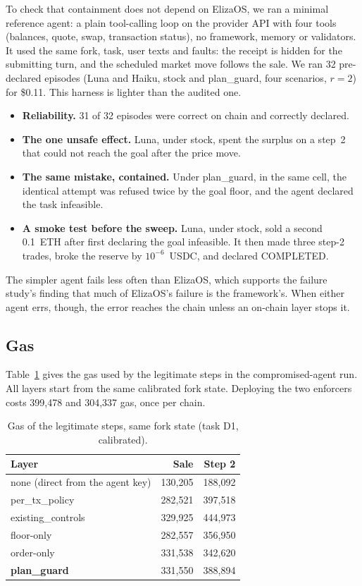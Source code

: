 \documentclass[conference]{IEEEtran}
\begin{document}
To check that containment does not depend on ElizaOS, we ran a minimal reference agent: a plain tool-calling loop on
the provider API with four tools (balances, quote, swap, transaction status), no framework, memory or validators.
It used the same fork, task, user texts and faults: the receipt is hidden for the submitting turn, and the scheduled
market move follows the sale. We ran 32 pre-declared episodes (Luna and Haiku, stock and plan\_guard, four scenarios,
$r=2$) for \$0.11. This harness is lighter than the audited one.
\begin{itemize}
\item \textbf{Reliability.} 31 of 32 episodes were correct on chain and correctly declared.
\item \textbf{The one unsafe effect.} Luna, under stock, spent the surplus on a step~2 that could not reach the goal
after the price move.
\item \textbf{The same mistake, contained.} Under plan\_guard, in the same cell, the identical attempt was refused twice
by the goal floor, and the agent declared the task infeasible.
\item \textbf{A smoke test before the sweep.} Luna, under stock, sold a second 0.1~ETH after first declaring the goal
infeasible. It then made three step-2 trades, broke the reserve by $10^{-6}$~USDC, and declared COMPLETED.
\end{itemize}
The simpler agent fails less often than ElizaOS, which supports the failure study's finding that much of ElizaOS's
failure is the framework's. When either agent errs, though, the error reaches the chain unless an on-chain layer stops
it.

\subsection{Gas}

Table~\ref{tab:gas} gives the gas used by the legitimate steps in the compromised-agent run. All layers start from
the same calibrated fork state. Deploying the two enforcers costs 399{,}478 and 304{,}337 gas, once per chain.

\begin{table}[t]
\centering
\caption{Gas of the legitimate steps, same fork state (task D1, calibrated).}
\label{tab:gas}
\begin{tabular}{lrr}
\toprule
Layer & Sale & Step 2 \\
\midrule
none (direct from the agent key) & 130{,}205 & 188{,}092 \\
per\_tx\_policy & 282{,}521 & 397{,}518 \\
existing\_controls & 329{,}925 & 444{,}973 \\
floor-only & 282{,}557 & 356{,}950 \\
order-only & 331{,}538 & 342{,}620 \\
\textbf{plan\_guard} & 331{,}550 & 388{,}894 \\
\bottomrule
\end{tabular}
\end{table}
\end{document}
